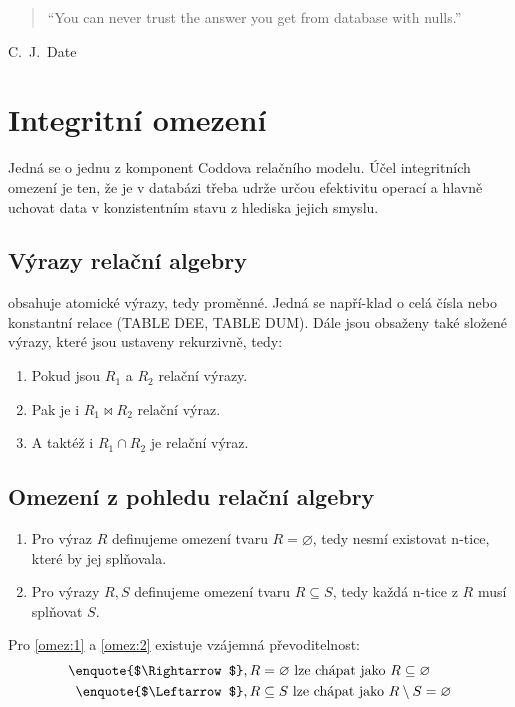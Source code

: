 \begin{quote}
\foreignlanguage{english}{\enquote{You can never trust the answer you get from database with nulls.}}
\end{quote}
\hfill C.~J.~Date

\section{Integritní omezení}
Jedná se o jednu z komponent Coddova relačního modelu. Účel integritních omezení je ten, že je v databázi třeba udrže určou efektivitu operací a hlavně uchovat data v konzistentním stavu z hlediska jejich smyslu.

\subsection{Výrazy relační algebry}
 obsahuje atomické výrazy, tedy proměnné. Jedná se napří-klad o celá čísla nebo konstantní relace (TABLE DEE, TABLE DUM). Dále jsou obsaženy také složené výrazy, které jsou ustaveny rekurzivně, tedy:
\begin{enumerate}
\item Pokud jsou $R_{1}$ a $R_{2}$ relační výrazy.
\item Pak je i $R_{1} \Join R_{2}$ relační výraz.
\item A taktéž i $R_{1} \cap R_{2}$ je relační výraz.
\end{enumerate}

\subsection{Omezení z pohledu relační algebry}
\begin{enumerate}
\item\label{omez:1} Pro výraz $R$ definujeme omezení tvaru $R = \varnothing$, tedy nesmí existovat n-tice, které by jej splňovala.
\item\label{omez:2} Pro výrazy $R, S$ definujeme omezení tvaru $R \subseteq S$, tedy každá n-tice z $R$ musí splňovat $S$.
\end{enumerate}
Pro \ref{omez:1} a \ref{omez:2} existuje vzájemná převoditelnost:
\begin{align*}
\text{\enquote{$\Rightarrow$}}&, R = \varnothing \text{ lze chápat jako } R \subseteq \varnothing \\
\text{\enquote{$\Leftarrow$}}&, R \subseteq S \text{ lze chápat jako } R \setminus S = \varnothing
\end{align*}

